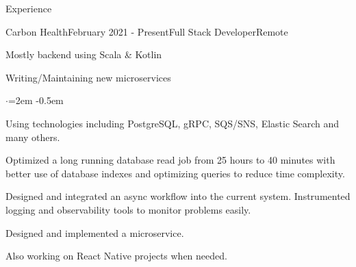 \documentclass{resume} %
\begin{document}
\begin{rSection}{Experience}

\begin{rSubsection}{Carbon Health}{February 2021 - Present}{Full Stack Developer}{Remote}
\item Mostly backend using Scala \& Kotlin
\item Writing/Maintaining new microservices
\begin{list}{$\cdot$}{\leftmargin=2em}
\itemsep -0.5em \vspace{-0.5em} %
    \item Using technologies including PostgreSQL, gRPC, SQS/SNS, Elastic Search and many others.
    \item Optimized a long running database read job from 25 hours to 40 minutes with better use of database indexes and optimizing queries to reduce time complexity.
    \item Designed and integrated an async workflow into the current system. Instrumented logging and observability tools to monitor problems easily.
    \item Designed and implemented a microservice.    
\end{list}
\item Also working on React Native projects when needed.
\end{rSubsection}



\end{rSection}
\end{document}

